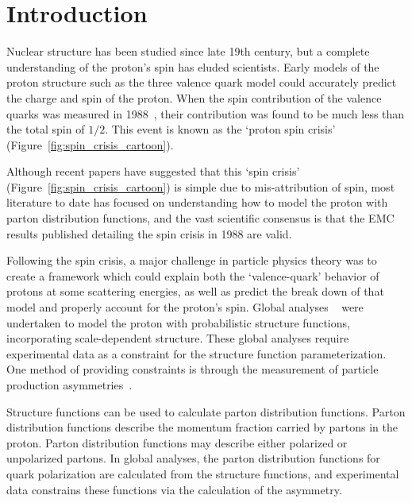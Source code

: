 \chapter{Introduction}

Nuclear structure has been studied since late 19th century, but a complete
understanding of the proton's spin has eluded scientists.  Early models of the
proton structure such as the three valence quark model could accurately predict
the charge and spin of the proton. When the spin contribution of the valence
quarks was measured in 1988~\cite{Ashman1988}, their contribution was found to
be much less than the total spin of $1/2$. This event is known as the `proton
spin crisis' (Figure~\ref{fig:spin_crisis_cartoon}).

Although recent papers \cite{Povh2016} have suggested that this `spin crisis'
(Figure~\ref{fig:spin_crisis_cartoon}) is simple due to mis-attribution of
spin, most literature to date has focused on understanding how to model the
proton with parton distribution functions, and the vast scientific consensus is
that the EMC results published detailing the spin crisis in 1988 are valid.

Following the spin crisis, a major challenge in particle physics theory was to
create a framework which could explain both the `valence-quark' behavior of
protons at some scattering energies, as well as predict the break down of that
model and properly account for the proton's spin. Global analyses
~\cite{DeFlorian2009} were undertaken to model the proton with probabilistic
structure functions, incorporating scale-dependent structure.  These global
analyses require experimental data as a constraint for the structure function
parameterization. One method of providing constraints is through the measurement
of particle production asymmetries~\cite{Kang2011}.

Structure functions can be used to calculate parton distribution functions.
Parton distribution functions describe the momentum fraction carried by partons
in the proton. Parton distribution functions may describe either polarized or
unpolarized partons. In global analyses, the parton distribution functions for
quark polarization are calculated from the structure functions, and experimental
data constrains these functions via the calculation of the asymmetry.

